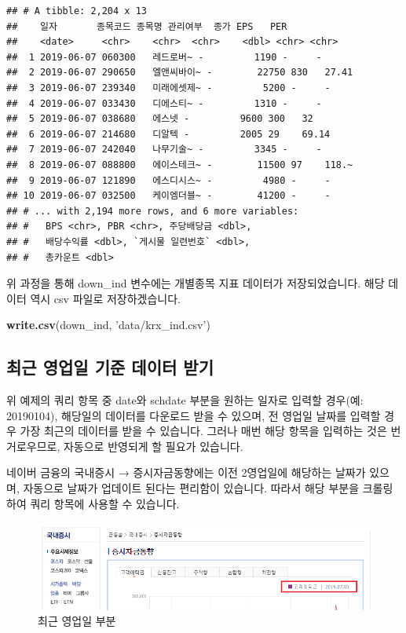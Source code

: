 \documentclass[12pt,]{book}
\newenvironment{Shaded}{\begin{snugshade}}{\end{snugshade}}
\newcommand{\KeywordTok}[1]{\textcolor[rgb]{0.13,0.29,0.53}{\textbf{#1}}}
\newcommand{\NormalTok}[1]{#1}
\newcommand{\StringTok}[1]{\textcolor[rgb]{0.31,0.60,0.02}{#1}}
\begin{document}
\begin{verbatim}
## # A tibble: 2,204 x 13
##    일자       종목코드 종목명 관리여부  종가 EPS   PER  
##    <date>     <chr>    <chr>  <chr>    <dbl> <chr> <chr>
##  1 2019-06-07 060300   레드로버~ -         1190 -     -    
##  2 2019-06-07 290650   엘앤씨바이~ -        22750 830   27.41
##  3 2019-06-07 239340   미래에셋제~ -         5200 -     -    
##  4 2019-06-07 033430   디에스티~ -         1310 -     -    
##  5 2019-06-07 038680   에스넷 -         9600 300   32   
##  6 2019-06-07 214680   디알텍 -         2005 29    69.14
##  7 2019-06-07 242040   나무기술~ -         3345 -     -    
##  8 2019-06-07 088800   에이스테크~ -        11500 97    118.~
##  9 2019-06-07 121890   에스디시스~ -         4980 -     -    
## 10 2019-06-07 032500   케이엠더블~ -        41200 -     -    
## # ... with 2,194 more rows, and 6 more variables:
## #   BPS <chr>, PBR <chr>, 주당배당금 <dbl>,
## #   배당수익률 <dbl>, `게시물 일련번호` <dbl>,
## #   총카운트 <dbl>
\end{verbatim}

위 과정을 통해 down\_ind 변수에는 개별종목 지표 데이터가 저장되었습니다. 해당 데이터 역시 csv 파일로 저장하겠습니다.

\begin{Shaded}
\begin{Highlighting}[]
\KeywordTok{write.csv}\NormalTok{(down_ind, }\StringTok{'data/krx_ind.csv'}\NormalTok{)}
\end{Highlighting}
\end{Shaded}

\hypertarget{section-21}{%
\subsection{최근 영업일 기준 데이터 받기}\label{section-21}}

위 예제의 쿼리 항목 중 date와 schdate 부분을 원하는 일자로 입력할 경우(예: 20190104), 해당일의 데이터를 다운로드 받을 수 있으며, 전 영업일 날짜를 입력할 경우 가장 최근의 데이터를 받을 수 있습니다. 그러나 매번 해당 항목을 입력하는 것은 번거로우므로, 자동으로 반영되게 할 필요가 있습니다.

네이버 금융의 국내증시 → 증시자금동향에는 이전 2영업일에 해당하는 날짜가 있으며, 자동으로 날짜가 업데이트 된다는 편리함이 있습니다. 따라서 해당 부분을 크롤링하여 쿼리 항목에 사용할 수 있습니다.

\begin{figure}[h]

{\centering \includegraphics[width=0.7\linewidth]{images/crawl_practice_recentdate} 

}

\caption{최근 영업일 부분}\label{fig:unnamed-chunk-12}
\end{figure}
\end{document}
